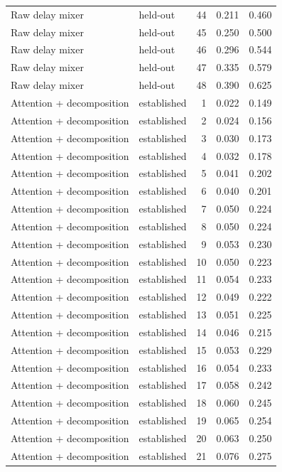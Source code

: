 \begin{tabular}{llrrr}
Raw delay mixer & held-out & 44 & 0.211 & 0.460 \\
Raw delay mixer & held-out & 45 & 0.250 & 0.500 \\
Raw delay mixer & held-out & 46 & 0.296 & 0.544 \\
Raw delay mixer & held-out & 47 & 0.335 & 0.579 \\
Raw delay mixer & held-out & 48 & 0.390 & 0.625 \\
Attention + decomposition & established & 1 & 0.022 & 0.149 \\
Attention + decomposition & established & 2 & 0.024 & 0.156 \\
Attention + decomposition & established & 3 & 0.030 & 0.173 \\
Attention + decomposition & established & 4 & 0.032 & 0.178 \\
Attention + decomposition & established & 5 & 0.041 & 0.202 \\
Attention + decomposition & established & 6 & 0.040 & 0.201 \\
Attention + decomposition & established & 7 & 0.050 & 0.224 \\
Attention + decomposition & established & 8 & 0.050 & 0.224 \\
Attention + decomposition & established & 9 & 0.053 & 0.230 \\
Attention + decomposition & established & 10 & 0.050 & 0.223 \\
Attention + decomposition & established & 11 & 0.054 & 0.233 \\
Attention + decomposition & established & 12 & 0.049 & 0.222 \\
Attention + decomposition & established & 13 & 0.051 & 0.225 \\
Attention + decomposition & established & 14 & 0.046 & 0.215 \\
Attention + decomposition & established & 15 & 0.053 & 0.229 \\
Attention + decomposition & established & 16 & 0.054 & 0.233 \\
Attention + decomposition & established & 17 & 0.058 & 0.242 \\
Attention + decomposition & established & 18 & 0.060 & 0.245 \\
Attention + decomposition & established & 19 & 0.065 & 0.254 \\
Attention + decomposition & established & 20 & 0.063 & 0.250 \\
Attention + decomposition & established & 21 & 0.076 & 0.275 \\

\end{tabular}
